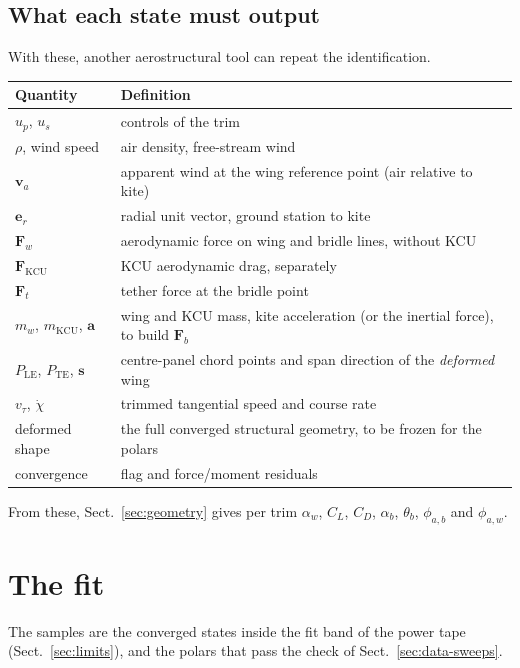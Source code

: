 \documentclass[11pt,a4paper]{article}
\begin{document}
\subsection{What each state must output}
With these, another aerostructural tool can repeat the identification.
\begin{center}
\small
\begin{tabular}{lp{}}
\toprule
Quantity & Definition \\
\midrule
$u_p$, $u_s$ & controls of the trim \\
$\rho$, wind speed & air density, free-stream wind \\
$\mathbf v_a$ & apparent wind at the wing reference point (air relative to kite) \\
$\mathbf e_r$ & radial unit vector, ground station to kite \\
$\mathbf F_w$ & aerodynamic force on wing and bridle lines, without KCU \\
$\mathbf F_\mathrm{KCU}$ & KCU aerodynamic drag, separately \\
$\mathbf F_t$ & tether force at the bridle point \\
$m_w$, $m_\mathrm{KCU}$, $\mathbf a$ & wing and KCU mass, kite acceleration (or the inertial force), to build $\mathbf F_b$ \\
$P_\mathrm{LE}$, $P_\mathrm{TE}$, $\mathbf s$ & centre-panel chord points and span direction of the \emph{deformed} wing \\
$v_\tau$, $\dot\chi$ & trimmed tangential speed and course rate \\
deformed shape & the full converged structural geometry, to be frozen for the polars \\
convergence & flag and force/moment residuals \\
\bottomrule
\end{tabular}
\end{center}
From these, Sect.~\ref{sec:geometry} gives per trim $\alpha_w$, $C_L$,
$C_D$, $\alpha_b$, $\theta_b$, $\phi_{a,b}$ and $\phi_{a,w}$.

\section{The fit}
\label{sec:method}
The samples are the converged states inside the fit band of the power tape
(Sect.~\ref{sec:limits}), and the polars that pass the check of
Sect.~\ref{sec:data-sweeps}.
\end{document}
